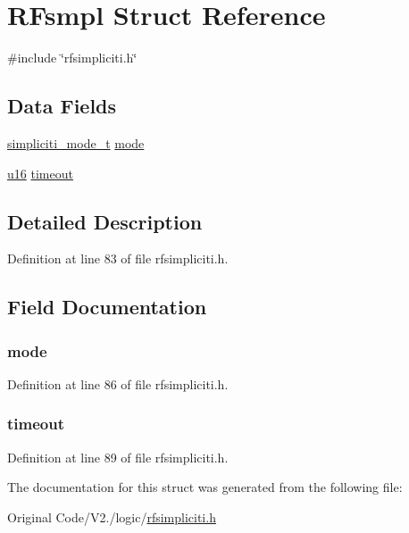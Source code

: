 \hypertarget{structRFsmpl}{\section{\-R\-Fsmpl \-Struct \-Reference}
\label{structRFsmpl}
}


{\ttfamily \#include \char`\"{}rfsimpliciti.\-h\char`\"{}}

\subsection*{\-Data \-Fields}
\begin{DoxyCompactItemize}
\item 
\hyperlink{rfsimpliciti_8h_a8f634dc8404e983a244ef648a1c38ece}{simpliciti\-\_\-mode\-\_\-t} \hyperlink{structRFsmpl_acd0291bcfc1da85956dd49b6b90e6ca3}{mode}
\item 
\hyperlink{main__ED__BM_8c_a9e6c91d77e24643b888dbd1a1a590054}{u16} \hyperlink{structRFsmpl_a735bf6536b07682f96c9417b0f1e9079}{timeout}
\end{DoxyCompactItemize}


\subsection{\-Detailed \-Description}


\-Definition at line 83 of file rfsimpliciti.\-h.



\subsection{\-Field \-Documentation}
\hypertarget{structRFsmpl_acd0291bcfc1da85956dd49b6b90e6ca3}{
\subsubsection[{mode}]{ {\bf mode}}}\label{structRFsmpl_acd0291bcfc1da85956dd49b6b90e6ca3}


\-Definition at line 86 of file rfsimpliciti.\-h.

\hypertarget{structRFsmpl_a735bf6536b07682f96c9417b0f1e9079}{
\subsubsection[{timeout}]{ {\bf timeout}}}\label{structRFsmpl_a735bf6536b07682f96c9417b0f1e9079}


\-Definition at line 89 of file rfsimpliciti.\-h.



\-The documentation for this struct was generated from the following file\-:\begin{DoxyCompactItemize}
\item 
\-Original Code/\-V2./logic/\hyperlink{rfsimpliciti_8h}{rfsimpliciti.\-h}\end{DoxyCompactItemize}
